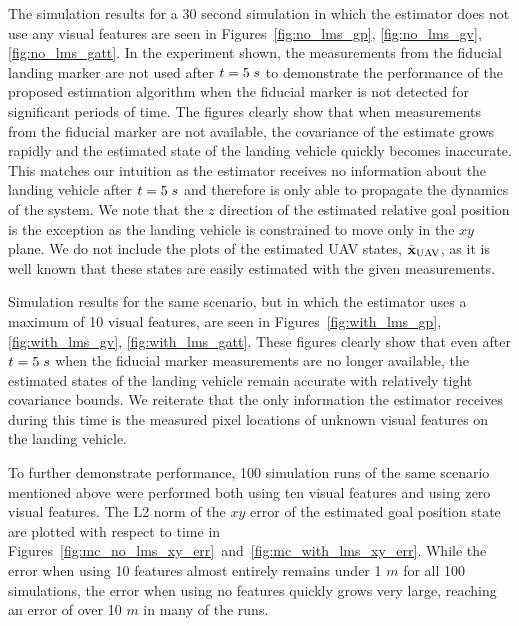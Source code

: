The simulation results for a 30 second simulation in which the estimator does
not use any visual features are seen in
Figures~\ref{fig:no_lms_gp}, \ref{fig:no_lms_gv}, \ref{fig:no_lms_gatt}. In the
experiment shown, the measurements from the fiducial landing marker are not used
after $t = 5 \hphantom{\cdot} s$ to demonstrate the performance of the proposed
estimation algorithm when the fiducial marker is not detected for significant
periods of time. The figures clearly show that when measurements from the
fiducial marker are not available, the covariance of the estimate grows rapidly
and the estimated state of the landing vehicle quickly becomes inaccurate. This
matches our intuition as the estimator receives no information about the landing
vehicle after $t = 5 \hphantom{\cdot} s$ and therefore is only able to propagate
the dynamics of the system. We note that the $z$ direction of the estimated
relative goal position is the exception as the landing vehicle is constrained to
move only in the $xy$ plane. We do not include the plots of the estimated UAV states,
$\hat{\boldsymbol{\mathrm{x}}}_{\text{UAV}}$, as it is well known that these states are easily
estimated with the given measurements.

Simulation results for the same scenario, but in which the estimator uses a
maximum of 10 visual features, are seen in
Figures~\ref{fig:with_lms_gp}, \ref{fig:with_lms_gv}, \ref{fig:with_lms_gatt}.
These figures clearly show that even after $t = 5 \hphantom{\cdot} s$ when the
fiducial marker measurements are no longer available, the estimated states of
the landing vehicle remain accurate with relatively tight covariance bounds. We
reiterate that the only information the estimator receives during this time is
the measured pixel locations of unknown visual features on the landing vehicle.

To further demonstrate performance, 100 simulation runs of the same scenario
mentioned above were performed
both using ten visual features and using zero visual features. The L2 norm of
the $xy$ error of the estimated goal position state are plotted
with respect to time in
Figures~\ref{fig:mc_no_lms_xy_err}~and~\ref{fig:mc_with_lms_xy_err}. While the
error when using 10 features
almost entirely remains under 1 $m$ for all 100 simulations, the error when using
no features quickly grows very large, reaching an error of over 10 $m$ in many
of the runs.



